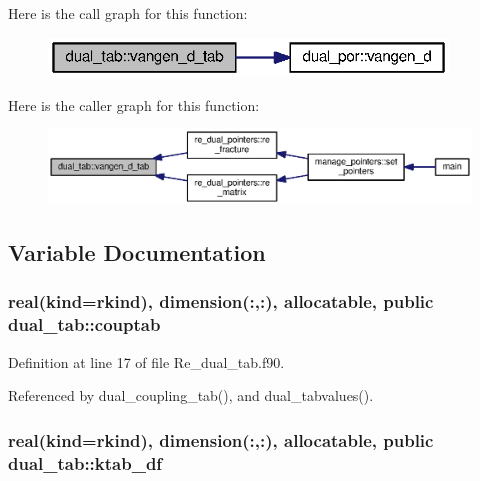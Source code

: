 Here is the call graph for this function\+:
\nopagebreak
\begin{figure}[H]
\begin{center}
\leavevmode
\includegraphics[width=301pt]{namespacedual__tab_a4c7205301837b0f1b9b645d4cbb4b6ea_cgraph}
\end{center}
\end{figure}




Here is the caller graph for this function\+:\nopagebreak
\begin{figure}[H]
\begin{center}
\leavevmode
\includegraphics[width=350pt]{namespacedual__tab_a4c7205301837b0f1b9b645d4cbb4b6ea_icgraph}
\end{center}
\end{figure}




\subsection{Variable Documentation}
\subsubsection[{couptab}]{\setlength{\rightskip}{0pt plus 5cm}real(kind=rkind), dimension(\+:,\+:), allocatable, public dual\+\_\+tab\+::couptab}\label{namespacedual__tab_ab21a774ac1679a77924cbef41f3af99e}


Definition at line 17 of file Re\+\_\+dual\+\_\+tab.\+f90.



Referenced by dual\+\_\+coupling\+\_\+tab(), and dual\+\_\+tabvalues().

\subsubsection[{ktab\+\_\+df}]{\setlength{\rightskip}{0pt plus 5cm}real(kind=rkind), dimension(\+:,\+:), allocatable, public dual\+\_\+tab\+::ktab\+\_\+df}\label{namespacedual__tab_a5f6d5fd4c1d4fd4cd39e1a12c2cfbb8e}


